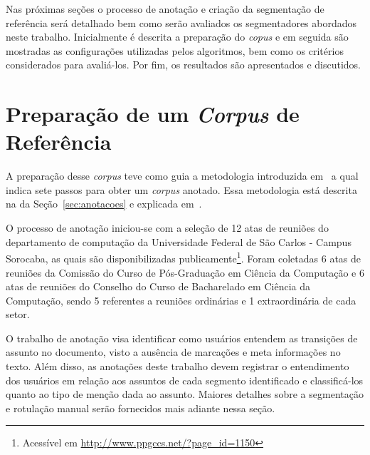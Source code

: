 Nas próximas seções o processo de anotação e criação da segmentação de referência será detalhado bem como serão avaliados os segmentadores abordados neste trabalho. Inicialmente é descrita a preparação do \textit{copus} e em seguida são mostradas as configurações utilizadas pelos algoritmos, bem como os critérios considerados para avaliá-los. Por fim, os resultados são apresentados e discutidos.




\section{Preparação de um \textit{Corpus} de Referência}
\label{sec:preparacaocorpusreferencia}



A preparação desse \textit{corpus} teve como guia a metodologia introduzida em~\cite{Hovy2010} a qual indica sete passos para obter um \textit{corpus} anotado. Essa metodologia está descrita na da Seção~\ref{sec:anotacoes} e explicada em~\cite{Cardoso2017}. 



O processo de anotação iniciou-se com a seleção de 12 atas de reuniões do departamento de computação da Universidade Federal de São Carlos - Campus Sorocaba, as quais são disponibilizadas publicamente\footnote{Acessível em  \url{http://www.ppgccs.net/?page\_id=1150}}. Foram coletadas 6 atas de reuniões da Comissão do Curso de Pós-Graduação em Ciência da Computação e 6 atas de reuniões do Conselho do Curso de Bacharelado em Ciência da Computação, sendo 5 referentes a reuniões ordinárias e 1 extraordinária de cada setor.

O trabalho de anotação visa identificar como usuários entendem as transições de assunto no documento, visto a ausência de marcações e meta informações no texto. Além disso, as anotações deste trabalho devem registrar o entendimento dos usuários em relação aos assuntos de cada segmento identificado e classificá-los quanto ao tipo de menção dada ao assunto. Maiores detalhes sobre a segmentação e rotulação manual serão fornecidos mais adiante nessa seção.


